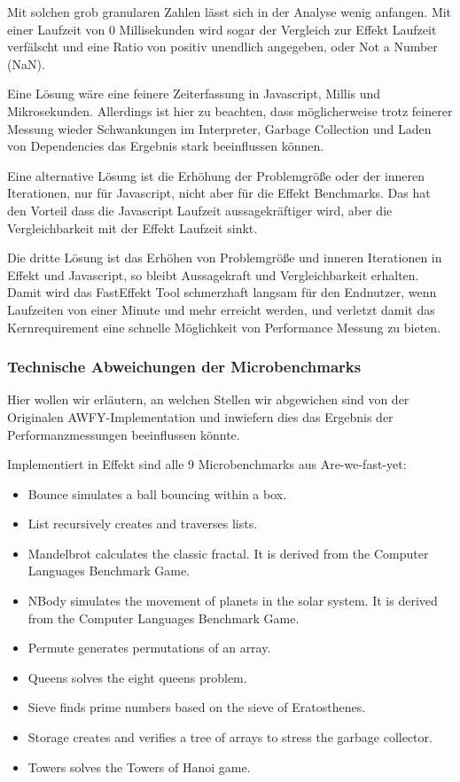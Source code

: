 Mit solchen grob granularen Zahlen lässt sich in der Analyse wenig anfangen. Mit einer Laufzeit von 0 Millisekunden wird sogar der Vergleich zur Effekt Laufzeit verfälscht und eine Ratio von positiv unendlich angegeben, oder Not a Number (NaN).

Eine Lösung wäre eine feinere Zeiterfassung in Javascript, Millis und Mikrosekunden. Allerdings ist hier zu beachten, dass möglicherweise trotz feinerer Messung wieder Schwankungen im Interpreter, Garbage Collection und Laden von Dependencies das Ergebnis stark beeinflussen können.

Eine alternative Lösung ist die Erhöhung der Problemgröße oder der inneren Iterationen, nur für Javascript, nicht aber für die Effekt Benchmarks.
Das hat den Vorteil dass die Javascript Laufzeit aussagekräftiger wird, aber die Vergleichbarkeit mit der Effekt Laufzeit sinkt.

Die dritte Lösung ist das Erhöhen von Problemgröße und inneren Iterationen in Effekt und Javascript, so bleibt Aussagekraft und Vergleichbarkeit erhalten.
Damit wird das FastEffekt Tool schmerzhaft langsam für den Endnutzer, wenn Laufzeiten von einer Minute und mehr erreicht werden, und verletzt damit das Kernrequirement eine schnelle Möglichkeit von Performance Messung zu bieten.

\subsubsection{ Technische Abweichungen der Microbenchmarks }
Hier wollen wir erläutern, an welchen Stellen wir abgewichen sind von der Originalen AWFY-Implementation und inwiefern dies das Ergebnis der Performanzmessungen beeinflussen könnte.

Implementiert in Effekt sind alle 9 Microbenchmarks aus Are-we-fast-yet:
\begin{itemize}
\item Bounce simulates a ball bouncing within a box.
\item List recursively creates and traverses lists.
\item Mandelbrot calculates the classic fractal. It is derived from the Computer Languages Benchmark Game.
\item NBody simulates the movement of planets in the solar system. It is derived from the Computer Languages Benchmark Game.
\item Permute generates permutations of an array.
\item Queens solves the eight queens problem.
\item Sieve finds prime numbers based on the sieve of Eratosthenes.
\item Storage creates and verifies a tree of arrays to stress the garbage collector.
\item Towers solves the Towers of Hanoi game.
\end{itemize}
